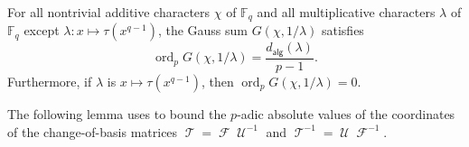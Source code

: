 \documentclass[12pt]{article}
\newcommand{\F}{\mathbb{F}}
\DeclareMathOperator{\ord}{ord}
\DeclareMathOperator{\FT}{\mathscr{F}}
\DeclareMathOperator{\UT}{\mathscr{U}}
\DeclareMathOperator{\TT}{\mathscr{T}}
\newcommand{\adeg}[1]{d_{\mathsf{alg}}(#1)}
\begin{document}
\begin{theorem} \label{thm:stickelberger}
For all nontrivial additive characters $\chi$ of $\F_q$ and all multiplicative characters $\lambda$ of $\F_q$ except $\lambda : x \mapsto \tau(x^{q - 1})$, the Gauss sum $G(\chi, 1/\lambda)$ satisfies
\begin{equation*}
\ord_p G(\chi, 1/\lambda) = \frac{\adeg{\lambda}}{p - 1}.
\end{equation*}
Furthermore, if $\lambda$ is $x \mapsto \tau(x^{q - 1})$, then $\ord_p G(\chi, 1/\lambda) = 0$.
\end{theorem}

The following lemma uses  to bound the $p$-adic absolute values of the coordinates of the change-of-basis matrices $\TT = \FT \UT^{-1}$ and $\TT^{-1} = \UT \FT^{-1}$.
\end{document}

